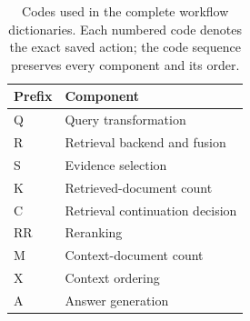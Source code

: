 \begin{table}[p]
\centering
\small
\setlength{\tabcolsep}{4pt}
\caption{Codes used in the complete workflow dictionaries. Each numbered code denotes the exact saved action; the code sequence preserves every component and its order.}
\label{tab:rag-config-code-definitions}
\begin{tabular}{@{}ll@{}}
\toprule
Prefix & Component \\
\midrule
Q & Query transformation \\
R & Retrieval backend and fusion \\
S & Evidence selection \\
K & Retrieved-document count \\
C & Retrieval continuation decision \\
RR & Reranking \\
M & Context-document count \\
X & Context ordering \\
A & Answer generation \\
\bottomrule
\end{tabular}
\end{table}

